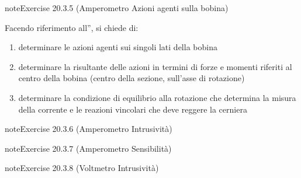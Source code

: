 \documentclass[letterpaper,10pt,italian]{jupyterBook}
\begin{document}
\begin{sphinxadmonition}{note}{Exercise 20.3.5 (Amperometro \sphinxhyphen{} Azioni agenti sulla bobina)}



\sphinxAtStartPar
Facendo riferimento all”{\hyperref[\detokenize{ch/electromagnetism/electromagnetism-steady:physics-hs-electromagnetism-electromagnetism-steady-experience-faraday-amperometer}]{}}, si chiede di:
\begin{enumerate}
%
\item {} 
\sphinxAtStartPar
determinare le azioni agenti sui singoli lati della bobina

\item {} 
\sphinxAtStartPar
determinare la risultante delle azioni in termini di forze e momenti riferiti al centro della bobina (centro della sezione, sull’asse di rotazione)

\item {} 
\sphinxAtStartPar
determinare la condizione di equilibrio alla rotazione che determina la misura della corrente e le reazioni vincolari che deve reggere la cerniera

\end{enumerate}
\end{sphinxadmonition}
 \label{exercise:ch/electromagnetism/electromagnetism-steady-problems-exercise-1}

\begin{sphinxadmonition}{note}{Exercise 20.3.6 (Amperometro \sphinxhyphen{} Intrusività)}


\end{sphinxadmonition}
 \label{exercise:ch/electromagnetism/electromagnetism-steady-problems-exercise-2}

\begin{sphinxadmonition}{note}{Exercise 20.3.7 (Amperometro \sphinxhyphen{} Sensibilità)}


\end{sphinxadmonition}
 \label{exercise:ch/electromagnetism/electromagnetism-steady-problems-exercise-3}

\begin{sphinxadmonition}{note}{Exercise 20.3.8 (Voltmetro \sphinxhyphen{} Intrusività)}


\end{sphinxadmonition}
\end{document}
